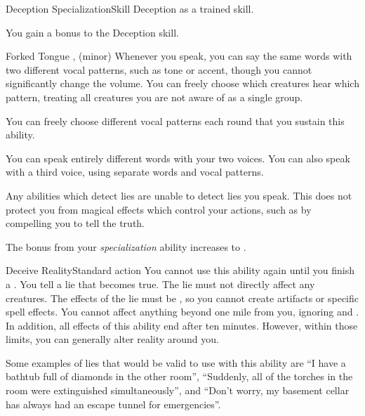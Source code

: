   \begin{feat}{Deception Specialization}{Skill}
    \featpre Deception as a trained skill.

     You gain a  bonus to the Deception skill.

    \begin{sustainability}{Forked Tongue}{}
      \abilitytags {},  (minor)
      \rankline
      Whenever you speak, you can say the same words with two different vocal patterns, such as tone or accent, though you cannot significantly change the volume.
      You can freely choose which creatures hear which pattern, treating all creatures you are not aware of as a single group.

      You can freely choose different vocal patterns each round that you sustain this ability.

      \rankline
       You can speak entirely different words with your two voices.
       You can also speak with a third voice, using separate words and vocal patterns.
    \end{sustainability}

     Any \magical abilities which detect lies are unable to detect lies you speak.
    This does not protect you from magical effects which control your actions, such as by compelling you to tell the truth.

     The bonus from your \textit{specialization} ability increases to .

    \begin{magicalactiveability}{Deceive Reality}{Standard action}
      \abilitycost You cannot use this ability again until you finish a .
      \rankline
      You tell a lie that becomes true.
      The lie must not directly affect any creatures.
      The effects of the lie must be , so you cannot create artifacts or specific spell effects.
      You cannot affect anything beyond one mile from you, ignoring  and .
      In addition, all effects of this ability end after ten minutes.
      However, within those limits, you can generally alter reality around you.

      Some examples of lies that would be valid to use with this ability are ``I have a bathtub full of diamonds in the other room'', ``Suddenly, all of the torches in the room were extinguished simultaneously'', and ``Don't worry, my basement cellar has always had an escape tunnel for emergencies''.
    \end{magicalactiveability}
  \end{feat}

